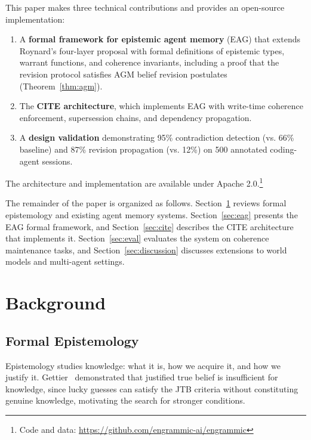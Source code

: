 \documentclass[11pt,letterpaper]{article}
\begin{document}
This paper makes three technical contributions and provides an open-source implementation:
\begin{enumerate}[noitemsep]
    \item A \textbf{formal framework for epistemic agent memory} (EAG) that extends Roynard's four-layer proposal with formal definitions of epistemic types, warrant functions, and coherence invariants, including a proof that the revision protocol satisfies AGM belief revision postulates (Theorem~\ref{thm:agm}).
    \item The \textbf{CITE architecture}, which implements EAG with write-time coherence enforcement, supersession chains, and dependency propagation.
    \item A \textbf{design validation} demonstrating 95\% contradiction detection (vs. 66\% baseline) and 87\% revision propagation (vs. 12\%) on 500 annotated coding-agent sessions.
\end{enumerate}
The architecture and implementation are available under Apache 2.0.\footnote{Code and data: \url{https://github.com/engrammic-ai/engrammic}}

The remainder of the paper is organized as follows. Section~\ref{sec:background} reviews formal epistemology and existing agent memory systems. Section~\ref{sec:eag} presents the EAG formal framework, and Section~\ref{sec:cite} describes the CITE architecture that implements it. Section~\ref{sec:eval} evaluates the system on coherence maintenance tasks, and Section~\ref{sec:discussion} discusses extensions to world models and multi-agent settings.

\section{Background}
\label{sec:background}

\subsection{Formal Epistemology}

Epistemology studies knowledge: what it is, how we acquire it, and how we justify it. Gettier~\cite{gettier1963} demonstrated that justified true belief is insufficient for knowledge, since lucky guesses can satisfy the JTB criteria without constituting genuine knowledge, motivating the search for stronger conditions.
\end{document}
